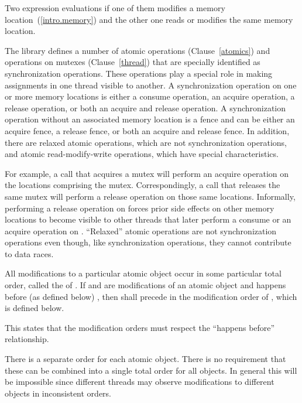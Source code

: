 \pnum
Two expression evaluations  if one of them modifies a memory
location~(\ref{intro.memory}) and the other one reads or modifies the same
memory location.

\pnum
The library defines a number of atomic operations (Clause~\ref{atomics}) and
operations on mutexes (Clause~\ref{thread}) that are specially identified as
synchronization operations. These operations play a special role in making
assignments in one thread visible to another. A synchronization operation on one
or more memory locations is either a consume operation, an acquire operation, a
release operation, or both an acquire and release operation. A synchronization
operation without an associated memory location is a fence and can be either an
acquire fence, a release fence, or both an acquire and release fence. In
addition, there are relaxed atomic operations, which are not synchronization
operations, and atomic read-modify-write operations, which have special
characteristics. \begin{note} For example, a call that acquires a mutex will
perform an acquire operation on the locations comprising the mutex.
Correspondingly, a call that releases the same mutex will perform a release
operation on those same locations. Informally, performing a release operation on
 forces prior
%
side effects on other memory locations to become visible
to other threads that later perform a consume or an acquire operation on
. ``Relaxed'' atomic operations are not synchronization operations even
though, like synchronization operations, they cannot contribute to data races.
\end{note}

\pnum
All modifications to a particular atomic object  occur in some
particular total order, called the  of . If
 and  are modifications of an atomic object  and
 happens before (as defined below) , then  shall precede
 in the modification order of , which is defined below.
\begin{note} This states that the modification orders must respect the ``happens
before'' relationship. \end{note} \begin{note} There is a separate order for each
atomic object. There is no requirement that these can be combined into a single
total order for all objects. In general this will be impossible since different
threads may observe modifications to different objects in inconsistent orders.
\end{note}

